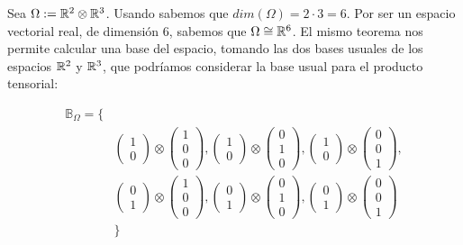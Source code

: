 \begin{ejemplo}
    Sea $\Omega := \mathbb{R}^2 \otimes \mathbb{R}^3$. Usando  sabemos que $dim(\Omega) = 2 \cdot 3 = 6$. Por ser un espacio vectorial real, de dimensión $6$, sabemos que $\Omega \cong \mathbb{R}^6$. El mismo teorema nos permite calcular una base del espacio, tomando las dos bases usuales de los espacios $\mathbb{R}^2$ y $\mathbb{R}^3$, que podríamos considerar la base usual para el producto tensorial:

    \begin{equation}
    \begin{split}
    \mathbb{B}_{\Omega} = \{& \\
        & \begin{pmatrix}1 \\ 0 \end{pmatrix} \otimes \begin{pmatrix} 1 \\ 0 \\ 0 \end{pmatrix},
        \begin{pmatrix}1 \\ 0 \end{pmatrix} \otimes \begin{pmatrix} 0 \\ 1 \\ 0 \end{pmatrix},
        \begin{pmatrix}1 \\ 0 \end{pmatrix} \otimes \begin{pmatrix} 0 \\ 0 \\ 1 \end{pmatrix}, \\
        & \begin{pmatrix}0 \\ 1 \end{pmatrix} \otimes \begin{pmatrix} 1 \\ 0 \\ 0 \end{pmatrix},
        \begin{pmatrix}0 \\ 1 \end{pmatrix} \otimes \begin{pmatrix} 0 \\ 1 \\ 0 \end{pmatrix},
        \begin{pmatrix}0 \\ 1 \end{pmatrix} \otimes \begin{pmatrix} 0 \\ 0 \\ 1 \end{pmatrix} \\
    & \}
    \end{split}
    \end{equation}
\end{ejemplo}

